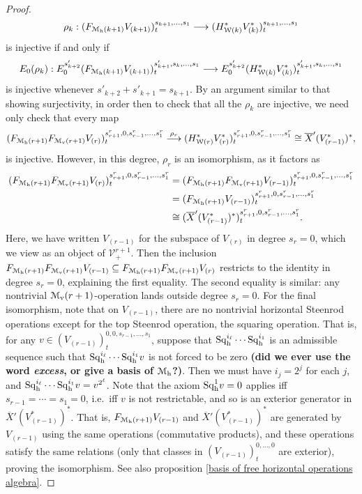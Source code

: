 \documentclass[11pt]{amsart}
\theoremstyle{plain}
\theoremstyle{definition}
\renewcommand{\to}{\longrightarrow}
\newcommand{\calW}{\mathcal{W}}
\newcommand{\calV}{\mathcal{V}}
\newcommand{\calM}{\mathcal{M}}
\theoremstyle{plain}
\newcommand{\vect}[2]{\calV^{#1}_{#2}}
\newcommand{\UEAX}{\overline{X}'}%
\newcommand{\Sq}{\mathrm{Sq}}
\begin{document}
\begin{Calculations of HWn for n nonzero}
\begin{proof}
\[\rho_k:(F_{\calM_{\textup{h}}(k+1)}V_{(k+1)})_t^{s_{k+1},\ldots,s_1}\to (H_{\calW(k)}^{*}V^{*}_{(k)})_t^{s_{k+1},\ldots,s_1}\]
is injective if and only if
\[E_0(\rho_k):E_0^{s'_{k+2}}(F_{\calM_{\textup{h}}(k+1)}V_{(k+1)})_t^{s'_{k+1},s_k,\ldots,s_1}\to E_0^{s'_{k+2}}(H_{\calW(k)}^{*}V^{*}_{(k)})_t^{s'_{k+1},s_k,\ldots,s_1}\]
is injective whenever $s'_{k+2}+s'_{k+1}=s_{k+1}$. By an argument similar to that showing surjectivity, in order then to check that all the $\rho_k$ are injective, we need only check that every map
\[(F_{\calM_{\textup{h}}(r+1)}F_{\calM_{\textup{v}}(r+1)}V_{(r)})^{s_{r+1}^{r},0,s_{r-1}^{r},\ldots,s_1^{r}}_{t} \overset{\rho_r}{\to}(H_{\calW(r)}^{*}V^{*}_{(r)})^{s_{r+1}^{r},0,s_{r-1}^{r},\ldots,s_1^{r}}_{t}\cong\UEAX(V_{(r-1)}^*)^*,\]
is injective. However, in this degree, $\rho_r$ is an isomorphism, as it factors as
\begin{alignat*}{2}
(F_{\calM_{\textup{h}}(r+1)}F_{\calM_{\textup{v}}(r+1)}V_{(r)})^{s_{r+1}^{r},0,s_{r-1}^{r},\ldots,s_1^{r}}_{t}
&=
(F_{\calM_{\textup{h}}(r+1)}F_{\calM_{\textup{v}}(r+1)}V_{(r-1)})^{s_{r+1}^{r},0,s_{r-1}^{r},\ldots,s_1^{r}}_{t}\\
&=(F_{\calM_{\textup{h}}(r+1)}V_{(r-1)})^{s_{r+1}^{r},0,s_{r-1}^{r},\ldots,s_1^{r}}_{t}\\
&\cong (\UEAX(V_{(r-1)}^*)^*)^{s_{r+1}^{r},0,s_{r-1}^{r},\ldots,s_1^{r}}_{t}.
\end{alignat*}
Here, we have written $V_{(r-1)}$ for the subspace of $V_{(r)}$ in degree $s_r=0$, which we view as an object of $\vect{r+1}{+}$. Then the inclusion $F_{\calM_{\textup{h}}(r+1)}F_{\calM_{\textup{v}}(r+1)}V_{(r-1)}\subseteq F_{\calM_{\textup{h}}(r+1)}F_{\calM_{\textup{v}}(r+1)}V_{(r)}$ restricts to the identity in degree $s_r=0$, explaining the first equality. The second equality is similar: any nontrivial $\calM_\textup{v}(r+1)$-operation lands outside degree $s_r=0$. For the final isomorphism, note that on $V_{(r-1)}$, there are no nontrivial horizontal Steenrod operations except for the top Steenrod operation, the squaring operation. That is, for any $v\in (V_{(r-1)})^{0,0,s_{r-1},\ldots, s_1}_t$, suppose that $\Sq_\textup{h}^{i_\ell}\cdots\Sq_\textup{h}^{i_1}$ is an admissible sequence such that $\Sq_\textup{h}^{i_\ell}\cdots\Sq_\textup{h}^{i_1}v$ is not forced to be zero \textbf{(did we ever use the word \emph{excess}, or give a basis of $\calM_\textup{h}$?)}. Then we must have $i_j=2^j$ for each $j$, and  $\Sq_\textup{h}^{i_\ell}\cdots\Sq_\textup{h}^{i_1}v=v^{2^\ell}$. Note that the axiom $\Sq_\textup{h}^1v=0$ applies iff $s_{r-1}=\cdots =s_1=0$, i.e.\ iff $v$ is not restrictable, and so is an exterior generator in $\UEAX(V_{(r-1)}^*)^*$. That is, $F_{\calM_{\textup{h}}(r+1)}V_{(r-1)}$ and $\UEAX(V_{(r-1)}^*)^*$ are generated by $V_{(r-1)}$ using the same operations (commutative products), and these operations satisfy the same relations (only that classes in $(V_{(r-1)})_t^{0,\ldots,0}$ are exterior), proving the isomorphism. See also proposition \ref{basis of free horizontal operations algebra}.
\end{proof}
\end{Calculations of HWn for n nonzero}
\end{document}
